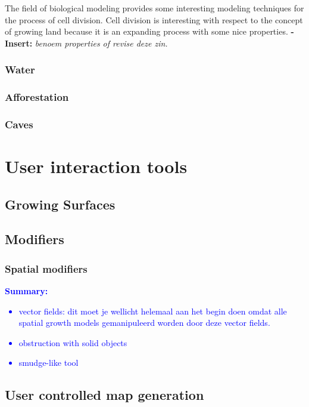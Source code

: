 \documentclass{article}
\newcommand{\inhoud}[1]{\textcolor{blue}{\textbf{\newline Summary: }\it{#1}}}
\newcommand{\voegtoe}[1]{\textcolor{MyDarkGreen}{\textbf{-Insert: }\it{#1}}}
\begin{document}
The field of biological modeling provides some interesting modeling techniques for the process of cell division. 
Cell division is interesting with respect to the concept of growing land because it is an expanding process with some nice properties. \voegtoe{benoem properties of revise deze zin.} 


\subsubsection{Water} 


\subsubsection{Afforestation} 

\subsubsection{Caves}

\section{User interaction tools}

\subsection{Growing Surfaces}

\subsection{Modifiers}

\subsubsection{Spatial modifiers}

\inhoud{
\begin{itemize}
\item vector fields: dit moet je wellicht helemaal aan het begin doen omdat alle spatial growth models
gemanipuleerd worden door deze vector fields.
\item obstruction with solid objects
\item smudge-like tool
\end{itemize}
}

\subsection{User controlled map generation}
\end{document}
